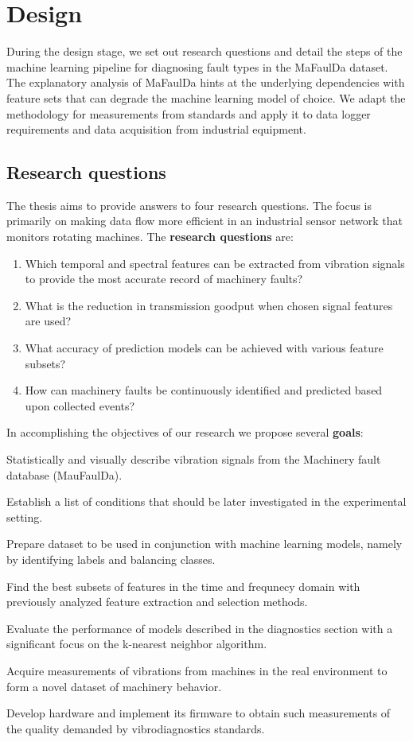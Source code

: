 \chapter{Design} \label{chapter:design}
During the design stage, we set out research questions and detail the steps of the machine learning pipeline for diagnosing fault types in the MaFaulDa dataset. The explanatory analysis of MaFaulDa hints at the underlying dependencies with feature sets that can degrade the machine learning model of choice. We adapt the methodology for measurements from standards and apply it to data logger requirements and data acquisition from industrial equipment.

\section{Research questions}
The thesis aims to provide answers to four research questions. The focus is primarily on making data flow more efficient in an industrial sensor network that monitors rotating machines. The \textbf{research questions} are:
\begin{enumerate}[label=RQ\arabic*., font=\bfseries]
    \itemsep0pt
	\item Which temporal and spectral features can be extracted from vibration signals to provide the most accurate record of machinery faults?
	\item What is the reduction in transmission goodput when chosen signal features are used?
	\item What accuracy of prediction models can be achieved with various feature subsets?
	\item How can machinery faults be continuously identified and predicted based upon collected events?
\end{enumerate}

\noindent In accomplishing the objectives of our research we propose several \textbf{goals}:
\begin{todolist}
    \itemsep0pt
    \item Statistically and visually describe vibration signals from the Machinery fault database (MauFaulDa).
    \item Establish a list of conditions that should be later investigated in the experimental setting.
    \item Prepare dataset to be used in conjunction with machine learning models, namely by identifying labels and balancing classes.
    \item Find the best subsets of features in the time and frequnecy domain with previously analyzed feature extraction and selection methods.
    \item Evaluate the performance of models described in the diagnostics section with a significant focus on the k-nearest neighbor algorithm.
    \item Acquire measurements of vibrations from machines in the real environment to form a novel dataset of machinery behavior.
    \item Develop hardware and implement its firmware to obtain such measurements of the quality demanded by vibrodiagnostics standards.
\end{todolist}

